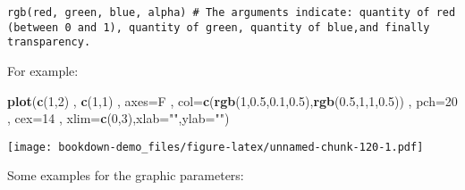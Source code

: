 \documentclass[]{book}
\newenvironment{Shaded}{\begin{snugshade}}{\end{snugshade}}
\newcommand{\KeywordTok}[1]{\textcolor[rgb]{0.13,0.29,0.53}{\textbf{#1}}}
\newcommand{\DataTypeTok}[1]{\textcolor[rgb]{0.13,0.29,0.53}{#1}}
\newcommand{\DecValTok}[1]{\textcolor[rgb]{0.00,0.00,0.81}{#1}}
\newcommand{\FloatTok}[1]{\textcolor[rgb]{0.00,0.00,0.81}{#1}}
\newcommand{\StringTok}[1]{\textcolor[rgb]{0.31,0.60,0.02}{#1}}
\newcommand{\NormalTok}[1]{#1}
\theoremstyle{definition}
\theoremstyle{definition}
\theoremstyle{definition}
\theoremstyle{remark}
\begin{document}
\begin{verbatim}
rgb(red, green, blue, alpha) # The arguments indicate: quantity of red (between 0 and 1), quantity of green, quantity of blue,and finally transparency.
\end{verbatim}

For example:

\begin{Shaded}
\begin{Highlighting}[]
\KeywordTok{plot}\NormalTok{(}\KeywordTok{c}\NormalTok{(}\DecValTok{1}\NormalTok{,}\DecValTok{2}\NormalTok{) , }\KeywordTok{c}\NormalTok{(}\DecValTok{1}\NormalTok{,}\DecValTok{1}\NormalTok{) , }\DataTypeTok{axes=}\NormalTok{F , }\DataTypeTok{col=}\KeywordTok{c}\NormalTok{(}\KeywordTok{rgb}\NormalTok{(}\DecValTok{1}\NormalTok{,}\FloatTok{0.5}\NormalTok{,}\FloatTok{0.1}\NormalTok{,}\FloatTok{0.5}\NormalTok{),}\KeywordTok{rgb}\NormalTok{(}\FloatTok{0.5}\NormalTok{,}\DecValTok{1}\NormalTok{,}\DecValTok{1}\NormalTok{,}\FloatTok{0.5}\NormalTok{)) , }\DataTypeTok{pch=}\DecValTok{20}\NormalTok{ , }\DataTypeTok{cex=}\DecValTok{14}\NormalTok{ , }\DataTypeTok{xlim=}\KeywordTok{c}\NormalTok{(}\DecValTok{0}\NormalTok{,}\DecValTok{3}\NormalTok{),}\DataTypeTok{xlab=}\StringTok{""}\NormalTok{,}\DataTypeTok{ylab=}\StringTok{""}\NormalTok{)}
\end{Highlighting}
\end{Shaded}

\texttt{[image: bookdown-demo\_files/figure-latex/unnamed-chunk-120-1.pdf]}

Some examples for the graphic parameters:
\end{document}
